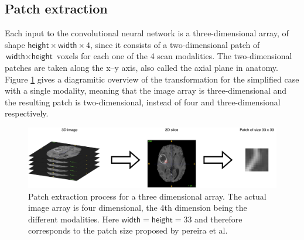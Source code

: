 \documentclass[12pt,a4paper,twoside,openright]{report}
\begin{document}
\subsection{Patch extraction}
\label{section:patch_extraction}
Each input to the convolutional neural network is a three-dimensional array, of shape $\textsf{height} \times \textsf{width} \times 4$, since it consists of a two-dimensional patch of $\textsf{width} \times \textsf{height}$ voxels for each one of the 4 scan modalities. The two-dimensional patches are taken along the x--y axis, also called the axial plane in anatomy. Figure \ref{fig:patch_extraction} gives a diagramitic overview of the transformation for the simplified case with a single modality, meaning that the image array is three-dimensional and the resulting patch is two-dimensional, instead of four and three-dimensional respectively.
\begin{figure}
	\centering
	\includegraphics[width=\textwidth]{patch_extraction}
	\caption[Patch extraction process for a three dimensional array.]{Patch extraction process for a three dimensional array. The actual image array is four dimensional, the 4th dimension being the different modalities. Here $\textsf{width}=\textsf{height}=33$ and therefore corresponds to the patch size proposed by pereira et al.}
	\label{fig:patch_extraction}
\end{figure}
\end{document}
